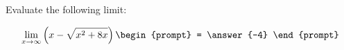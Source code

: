 \documentclass{ximera}
\author{Steven Gubkin}
\begin{document}
\begin{exercise}

Evaluate the following limit:

\[
\lim_{x \to \infty} \left(x - \sqrt{x^2+8x}\right) \begin{prompt} = \answer{-4} \end{prompt}
\]

\end{exercise}
\end{document}
